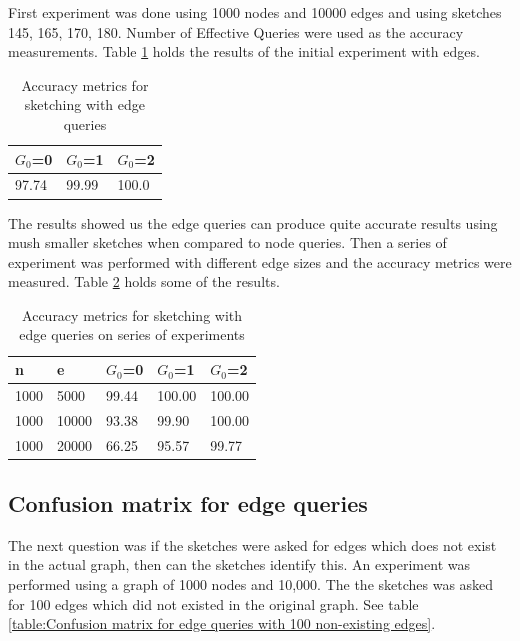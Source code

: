 \documentclass[conference]{IEEEtran}
\begin{document}
First experiment was done using 1000 nodes and 10000 edges and using sketches 145, 165, 170, 180. Number of Effective Queries were used as the accuracy measurements. Table \ref{table:Accuracy metrics for sketching with edge queries} holds the results of the initial experiment with edges.

\begin{table}[!b]
\caption{Accuracy metrics for sketching with edge queries}
\label{table:Accuracy metrics for sketching with edge queries}
\centering
\begin{tabular}{|l|l|l|}
\hline
$G_0$=0 & $G_0$=1 & $G_0$=2 \\ \hline
97.74  &   99.99  &   100.0\\ \hline
\end{tabular}
\end{table}

The results showed us the edge queries can produce quite accurate results using mush smaller sketches when compared to node queries. Then a series of experiment was performed with different edge sizes and the accuracy metrics were measured. Table \ref{table:Accuracy metrics for sketching with edge queries on series of experiments} holds some of the results.  

\begin{table}[!t]
\caption{Accuracy metrics for sketching with edge queries on series of experiments}
\label{table:Accuracy metrics for sketching with edge queries on series of experiments}
\centering
\begin{tabular}{|l|l|l|l|l|}
\hline
n    & e     & $G_0$=0 & $G_0$=1 & $G_0$=2 \\ \hline
1000 & 5000  & 99.44   & 100.00  & 100.00  \\ \hline
1000 & 10000 & 93.38   & 99.90   & 100.00  \\ \hline
1000 & 20000 & 66.25   & 95.57   & 99.77   \\ \hline
\end{tabular}
\end{table}

\subsection{Confusion matrix for edge queries}

The next question was if the sketches were asked for edges which does not exist in the actual graph, then can the sketches identify this. An experiment was performed using a graph of 1000 nodes and 10,000. The the sketches was asked for 100 edges which did not existed in the original graph. See table \ref{table:Confusion matrix for edge queries with 100 non-existing edges}.
\end{document}
